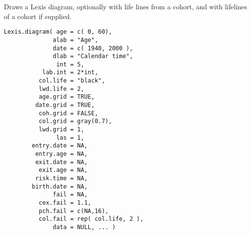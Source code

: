 \begin{Description}\relax
Draws a Lexis diagram, optionally with life lines from a cohort, and
with lifelines of a cohort if supplied.
\end{Description}
\begin{Usage}
\begin{verbatim}
Lexis.diagram( age = c( 0, 60), 
              alab = "Age",
              date = c( 1940, 2000 ),
              dlab = "Calendar time",
               int = 5,
           lab.int = 2*int, 
          col.life = "black",
          lwd.life = 2,
          age.grid = TRUE,
         date.grid = TRUE,
          coh.grid = FALSE,
          col.grid = gray(0.7),
          lwd.grid = 1,     
               las = 1,
        entry.date = NA,
         entry.age = NA,
         exit.date = NA,
          exit.age = NA,
         risk.time = NA,
        birth.date = NA,
              fail = NA,
          cex.fail = 1.1, 
          pch.fail = c(NA,16),
          col.fail = rep( col.life, 2 ),
              data = NULL, ... )
\end{verbatim}
\end{Usage}

